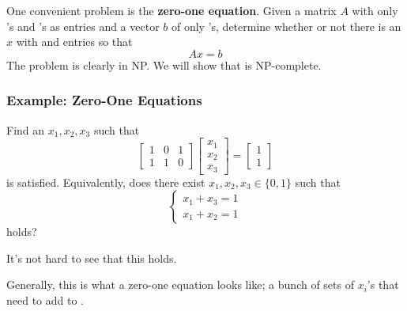 \documentclass[letterpaper]{article}
\begin{document}
\bigskip 

One convenient problem is the \textbf{zero-one equation}. Given a matrix $A$ with only 's and 's as entries and a vector $b$ of only 's, determine whether or not there is an $x$ with  and  entries so that 
\[Ax = b\]
The problem is clearly in NP. We will show that is NP-complete. 

\subsubsection{Example: Zero-One Equations}
Find an $x_1, x_2, x_3$ such that 
\[\begin{bmatrix}
    1 & 0 & 1 \\ 1 & 1 & 0
\end{bmatrix} \begin{bmatrix}
    x_1 \\ x_2 \\ x_3
\end{bmatrix} = \begin{bmatrix}
    1 \\ 1
\end{bmatrix}\]
is satisfied. Equivalently, does there exist $x_1, x_2, x_3 \in \{0, 1\}$ such that 
\[\begin{cases}
    x_1 + x_3 = 1 \\ 
    x_1 + x_2 = 1
\end{cases}\]
holds? 

\begin{mdframed}[]
    It's not hard to see that this holds.     
\end{mdframed}

Generally, this is what a zero-one equation looks like; a bunch of sets of $x_i$'s that need to add to . 
\end{document}

